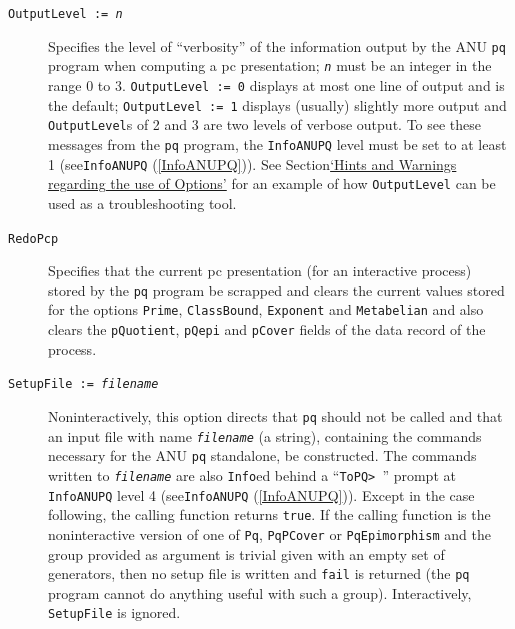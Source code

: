 \documentclass[a4paper,11pt]{report}
\begin{document}
{{\begin{description}
\item[{\texttt{OutputLevel := \mbox{\texttt{\mdseries\slshape n}}} \label{option OutputLevel}}]  Specifies the level of ``verbosity'' of the information output by the ANU \texttt{pq} program when computing a pc presentation; \mbox{\texttt{\mdseries\slshape n}} must be an integer in the range 0 to 3. \texttt{OutputLevel := 0} displays at most one line of output and is the default; \texttt{OutputLevel := 1} displays (usually) slightly more output and \texttt{OutputLevel}s of 2 and 3 are two levels of verbose output. To see these messages from the \texttt{pq} program, the \texttt{InfoANUPQ} level must be set to at least 1 (see{\nobreakspace}\texttt{InfoANUPQ} (\ref{InfoANUPQ})). See Section{\nobreakspace}\hyperref[Hints and Warnings regarding the use of Options]{`Hints and Warnings regarding the use of Options'} for an example of how \texttt{OutputLevel} can be used as a troubleshooting tool. 
\item[{\texttt{RedoPcp} \label{option RedoPcp}}]  Specifies that the current pc presentation (for an interactive process) stored
by the \texttt{pq} program be scrapped and clears the current values stored for the options \texttt{Prime}, \texttt{ClassBound}, \texttt{Exponent} and \texttt{Metabelian} and also clears the \texttt{pQuotient}, \texttt{pQepi} and \texttt{pCover} fields of the data record of the process. 
\item[{\texttt{SetupFile := \mbox{\texttt{\mdseries\slshape filename}}} \label{option SetupFile}}]  Non\texttt{}interactively, this option directs that \texttt{pq} should not be called and that an input file with name \mbox{\texttt{\mdseries\slshape filename}} (a string), containing the commands necessary for the ANU \texttt{pq} standalone, be constructed. The commands written to \mbox{\texttt{\mdseries\slshape filename}} are also \texttt{Info}\texttt{}ed behind a ``\texttt{ToPQ{\textgreater} }'' prompt at \texttt{InfoANUPQ} level 4 (see{\nobreakspace}\texttt{InfoANUPQ} (\ref{InfoANUPQ})). Except in the case following, the calling function returns \texttt{true}. If the calling function is the non\texttt{}interactive version of
one of \texttt{Pq}, \texttt{PqPCover} or \texttt{PqEpimorphism} and the group provided as argument is trivial given with an empty set of
generators, then no setup file is written and \texttt{fail} is returned (the \texttt{pq} program cannot do anything useful with such a group). Interactively, \texttt{SetupFile} is ignored. 


\end{description}}}
\end{document}
